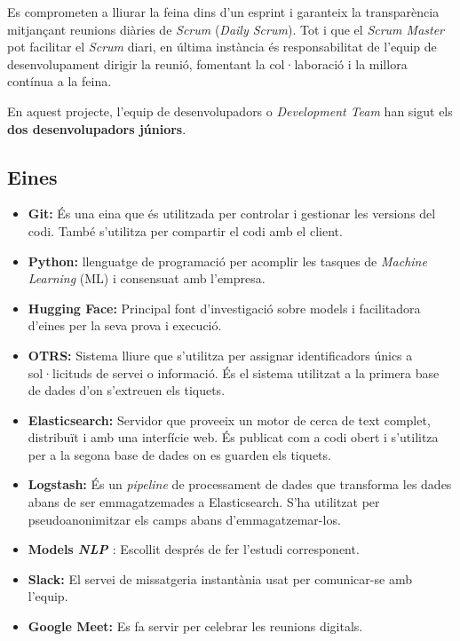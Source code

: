 Es comprometen a lliurar la feina dins d'un esprint i garanteix la transparència mitjançant reunions diàries de \textit{Scrum} (\textit{Daily Scrum}). Tot i que el \textit{Scrum Master} pot facilitar el \textit{Scrum} diari, en última instància és responsabilitat de l'equip de desenvolupament dirigir la reunió, fomentant la col·laboració i la millora contínua a la feina.

En aquest projecte, l'equip de desenvolupadors o \textit{Development Team} han sigut els \textbf{dos desenvolupadors júniors}.






\subsection{Eines}

\begin{itemize}
    \item \textbf{Git:} És una eina que és utilitzada per controlar i gestionar les versions del codi. També s'utilitza per compartir el codi amb el client.
    \item \textbf{Python:} llenguatge de programació per acomplir les tasques de \textit{Machine Learning} (ML) i consensuat amb l'empresa.
    \item \textbf{Hugging Face:} Principal font d'investigació sobre models i facilitadora d'eines per la seva prova i execució.
    \item \textbf{OTRS:} Sistema lliure que s'utilitza per assignar identificadors únics a sol·licituds de servei o informació. És el sistema utilitzat a la primera base de dades d'on s'extreuen els tiquets.
    \item \textbf{Elasticsearch:} Servidor que proveeix un motor de cerca de text complet, distribuït i amb una interfície web. És publicat com a codi obert i s'utilitza per a la segona base de dades on es guarden els tiquets.
    \item \textbf{Logstash:} És un \textit{pipeline} de processament de dades que transforma les dades abans de ser emmagatzemades a Elasticsearch. S'ha utilitzat per pseudoanonimitzar els camps abans d'emmagatzemar-los.
    \item \textbf{Models \textit{NLP} \cite{Hugging-Face}}: Escollit després de fer l'estudi corresponent.
    \item \textbf{Slack:} El servei de missatgeria instantània usat per comunicar-se amb l'equip.
    \item \textbf{Google Meet:} Es fa servir per celebrar les reunions digitals.
\end{itemize}